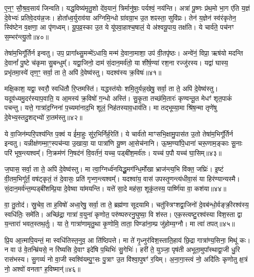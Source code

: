 ए॒न॒ꣳ॒ सौ॒श्र॒व॒साय॑ जिन्वति। यद्ध॒विष्य॑मृतु॒शो दे॑व॒यानं॒ त्रिर्मानु॑षाः॒ पर्यश्वं॒ नय॑न्ति। अत्रा॑ पू॒ष्णः प्र॑थ॒मो भा॒ग ए॑ति य॒ज्ञं दे॒वेभ्यः॑ प्रतिवे॒दय॑न्न॒जः। होता᳚ध्व॒र्युराव॑या अग्निमि॒न्धो ग्रा॑वग्रा॒भ उ॒त शꣴस्ता॒ सुवि॑प्रः। तेन॑ य॒ज्ञेन॑ स्व॑रंकृतेन॒ स्वि॑ष्टेन व॒क्षणा॒ आ पृ॑णध्वम्। यू॒प॒व्र॒स्का उ॒त ये यू॑पवा॒हाश्च॒षालं॒ ये अ॑श्वयू॒पाय॒ तक्ष॑ति। ये चार्व॑ते॒ पच॑नꣳ स॒म्भर॑न्त्यु॒तो॥४०॥

तेषा॑म॒भिगू᳚र्तिर्न इन्वतु। उप॒ प्रागा᳚थ्सु॒मन्मे॑\-ऽधायि॒ मन्म॑ दे॒वाना॒माशा॒ उप॑ वी॒तपृ॑ष्ठः। अन्वे॑नं॒ विप्रा॒ ऋष॑यो मदन्ति दे॒वानां᳚ पु॒ष्टे च॑कृमा सु॒बन्धुम्᳚। यद्वा॒जिनो॒ दाम॑ सं॒दान॒मर्व॑तो॒ या शी॑र्\mbox{}ष॒ण्या॑ रश॒ना रज्जु॑रस्य। यद्वा॑ घास्य॒ प्रभृ॑तमा॒स्ये॑ तृण॒ꣳ॒ सर्वा॒ ता ते॒ अपि॑ दे॒वेष्व॑स्तु। यदश्व॑स्य क्र॒विषः॑॥४१॥

मक्षि॒काश॒ यद्वा॒ स्वरौ॒ स्वधि॑तौ रि॒प्तमस्ति॑। यद्धस्त॑योः शमि॒तुर्यन्न॒खेषु॒ सर्वा॒ ता ते॒ अपि॑ दे॒वेष्व॑स्तु। यदूव॑ध्यमु॒दर॑स्याप॒वाति॒ य आ॒मस्य॑ क्र॒विषो॑ ग॒न्धो अस्ति॑। सु॒कृ॒ता तच्छ॑मि॒तारः॑ कृण्वन्तू॒त मेधꣳ॑ शृत॒पाकं॑ पचन्तु। यत्ते॒ गात्रा॑द॒ग्निना॑ प॒च्यमा॑नाद॒भि शूलं॒ निह॑तस्याव॒धाव॑ति। मा तद्भूम्या॒मा श्रि॑ष॒न्मा तृणे॑षु दे॒वेभ्य॒स्तदु॒शद्भ्यो॑ रा॒तम॑स्तु॥४२॥

{\anuvakamend[{इदु॒तो क्र॒विषः॑ श्रिषथ्स॒प्त च॑॥८॥}]}

ये वा॒जिन॑म्परि॒पश्य॑न्ति प॒क्वं य ई॑मा॒हुः सु॑र॒भिर्निर्\mbox{}ह॒रेति॑। ये चार्व॑तो माꣳसभि॒क्षामु॒पास॑त उ॒तो तेषा॑म॒भिगू᳚र्तिर्न इन्वतु। यन्नीक्ष॑णम्मा॒ꣳ॒स्पच॑न्या उ॒खाया॒ या पात्रा॑णि यू॒ष्ण आ॒सेच॑नानि। ऊ॒ष्म॒ण्या॑पि॒धाना॑ चरू॒णाम॒ङ्काः सू॒नाः परि॑ भूष॒न्त्यश्वम्᳚। नि॒क्रम॑णं नि॒षद॑नं वि॒वर्त॑नं॒ यच्च॒ पड्बी॑श॒मर्व॑तः। यच्च॑ प॒पौ यच्च॑ घा॒सिम्॥४३॥

ज॒घास॒ सर्वा॒ ता ते॒ अपि॑ दे॒वेष्व॑स्तु। मा त्वा॒ग्निर्ध्व॑नयिद्धू॒मग॑न्धि॒र्मोखा भ्राज॑न्त्य॒भि वि॑क्त॒ जघ्रिः॑। इ॒ष्टं वी॒तम॒भिगू᳚र्तं॒ वष॑ट्कृतं॒ तं दे॒वासः॒ प्रति॑ गृभ्ण॒न्त्यश्वम्᳚। यदश्वा॑य॒ वास॑ उपस्तृ॒णन्त्य॑धीवा॒सं या हिर॑ण्यान्यस्मै। सं॒दान॒मर्व॑न्त॒म्पड्बी॑शम्प्रि॒या दे॒वेष्वा या॑मयन्ति। यत्ते॑ सा॒दे मह॑सा॒ शूकृ॑तस्य॒ पार्ष्णि॑या वा॒ कश॑या॥४४॥

वा॒ तु॒तोद॑। स्रु॒चेव॒ ता ह॒विषो॑ अध्व॒रेषु॒ सर्वा॒ ता ते॒ ब्रह्म॑णा सूदयामि। चतु॑स्त्रिꣳशद्वा॒जिनो॑ दे॒वब॑न्धो॒र्वङ्क्री॒रश्व॑स्य॒ स्वधि॑तिः॒ समे॑ति। अच्छि॑द्रा॒ गात्रा॑ व॒युना॑ कृणोत॒ परु॑ष्परुरनु॒घुष्या॒ वि श॑स्त। एक॒स्त्वष्टु॒रश्व॑स्या विश॒स्ता द्वा य॒न्तारा॑ भवत॒स्तथ॒र्तुः। या ते॒ गात्रा॑णामृतु॒था कृ॒णोमि॒ ताता॒ पिण्डा॑ना॒म्प्र जु॑होम्य॒ग्नौ। मा त्वा॑ तपत्॥४५॥

प्रि॒य आ॒त्मापि॒यन्तं॒ मा स्वधि॑तिस्त॒नुव॒ आ ति॑ष्ठिपत्ते। मा ते॑ गृ॒ध्नुर॑विश॒स्ताति॒हाय॑ छि॒द्रा गात्रा॑ण्य॒सिना॒ मिथू॑ कः। न वा उ॑ वे॒तन्म्रि॑यसे॒ न रि॑ष्यसि दे॒वाꣳ इदे॑षि प॒थिभिः॑ सु॒गेभिः॑। हरी॑ ते॒ युञ्जा॒ पृष॑ती अभूता॒मुपा᳚स्थाद्वा॒जी धु॒रि रास॑भस्य। सु॒गव्यं॑ नो वा॒जी स्वश्वि॑यम्पु॒ꣳ॒सः पु॒त्राꣳ उ॒त वि॑श्वा॒पुषꣳ॑ र॒यिम्। अ॒ना॒गा॒स्त्वं नो॒ अदि॑तिः कृणोतु क्ष॒त्रं नो॒ अश्वो॑ वनताꣳ ह॒विष्मान्॑॥४६॥

